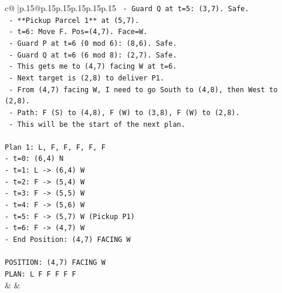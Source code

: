 \documentclass{article}
\begin{document}
{\begin{supertabular}{c@{$\;$}|p{.15\linewidth}@{}p{.15\linewidth}p{.15\linewidth}p{.15\linewidth}p{.15\linewidth}p{.15\linewidth}}
{{{\texttt{    {-} Guard Q at t=5: (3,7). Safe.} \\
\texttt{    {-} **Pickup Parcel 1** at (5,7).} \\
\texttt{  {-} t=6: Move F. Pos=(4,7). Face=W.} \\
\texttt{    {-} Guard P at t=6 (0 mod 6): (8,6). Safe.} \\
\texttt{    {-} Guard Q at t=6 (6 mod 8): (2,7). Safe.} \\
\texttt{    {-} This gets me to (4,7) facing W at t=6.} \\
\texttt{    {-} Next target is (2,8) to deliver P1.} \\
\texttt{    {-} From (4,7) facing W, I need to go South to (4,8), then West to (2,8).} \\
\texttt{    {-} Path: F (S) to (4,8), F (W) to (3,8), F (W) to (2,8).} \\
\texttt{    {-} This will be the start of the next plan.} \\
\\ 
\texttt{Plan 1: L, F, F, F, F, F} \\
\texttt{{-} t=0: (6,4) N} \\
\texttt{{-} t=1: L {-}> (6,4) W} \\
\texttt{{-} t=2: F {-}> (5,4) W} \\
\texttt{{-} t=3: F {-}> (5,5) W} \\
\texttt{{-} t=4: F {-}> (5,6) W} \\
\texttt{{-} t=5: F {-}> (5,7) W (Pickup P1)} \\
\texttt{{-} t=6: F {-}> (4,7) W} \\
\texttt{{-} End Position: (4,7) FACING W} \\
\\ 
\texttt{POSITION: (4,7) FACING W} \\
\texttt{PLAN: L F F F F F} \\
            }
        }
    }
    & & \\ \\


\end{supertabular}}
\end{document}
